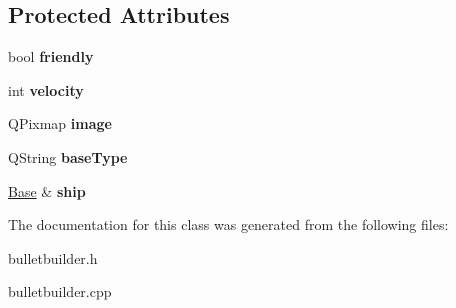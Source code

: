 \subsection*{Protected Attributes}
\begin{DoxyCompactItemize}
\item 
\mbox{\label{classgame_1_1BulletBuilder_ad04dd50b078c62404ee4dc4985215b2e}} 
bool {\bfseries friendly}
\item 
\mbox{\label{classgame_1_1BulletBuilder_a19da7e0a10986ed821bb8456ae5d93de}} 
int {\bfseries velocity}
\item 
\mbox{\label{classgame_1_1BulletBuilder_a3fdce5bd8b1c34048dbff0ff962a6c0a}} 
Q\+Pixmap {\bfseries image}
\item 
\mbox{\label{classgame_1_1BulletBuilder_a2af27dd173fadd5aef7d49752d649e16}} 
Q\+String {\bfseries base\+Type}
\item 
\mbox{\label{classgame_1_1BulletBuilder_afb44969f55ed129aadeddfc9b5ea5f63}} 
\hyperlink{classgame_1_1Base}{Base} \& {\bfseries ship}
\end{DoxyCompactItemize}


The documentation for this class was generated from the following files\+:\begin{DoxyCompactItemize}
\item 
bulletbuilder.\+h\item 
bulletbuilder.\+cpp\end{DoxyCompactItemize}
